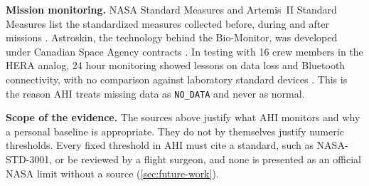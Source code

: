 \medskip\noindent\textbf{Mission monitoring.} NASA Standard Measures and Artemis~II Standard Measures list the standardized measures collected before, during and after missions \cite{nasa_standard_measures,nasa_artemis_ii_standard_measures}. Astroskin, the technology behind the Bio-Monitor, was developed under Canadian Space Agency contracts \cite{csa_wireless_body_sensors}. In testing with 16 crew members in the HERA analog, 24 hour monitoring showed lessons on data loss and Bluetooth connectivity, with no comparison against laboratory standard devices \cite{toscano2017astroskin}. This is the reason AHI treats missing data as \texttt{NO\_DATA} and never as normal.

\medskip\noindent\textbf{Scope of the evidence.} The sources above justify what AHI monitors and why a personal baseline is appropriate. They do not by themselves justify numeric thresholds. Every fixed threshold in AHI must cite a standard, such as NASA-STD-3001, or be reviewed by a flight surgeon, and none is presented as an official NASA limit without a source (\ref{sec:future-work}).
